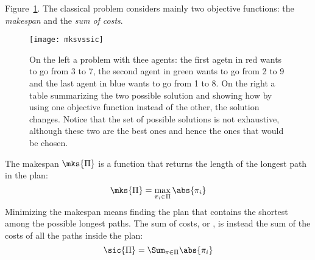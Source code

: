 Figure~\ref{fig:mksvssic}. The classical problem considers mainly two objective
functions: the \textit{makespan} and the \textit{sum of costs}. 
\begin{figure}[t]
  \centering
  \begin{minipage}{0.38\linewidth}
    \texttt{[image: mksvssic]}
  \end{minipage}
  \hfill
  
  \caption{On the left a  problem with thee agents: the first agetn
  in red wants to go from 3 to 7, the second agent in green wants to go from 2
  to 9 and the last agent in blue wants to go from 1 to 8. On the right a table
  summarizing the two possible solution and showing how by using one objective
  function instead of the other, the solution changes. Notice that the set of
  possible solutions is not exhaustive, although these two are the best ones 
  and hence the ones that would be chosen.}
  \label{fig:mksvssic}
\end{figure}
\newline
The makespan $\mks{\Pi}$ is a function that returns the length of the longest
path in the plan:
\begin{equation}
  \mks{\Pi}=\max\limits_{\pi_i\in\Pi}\abs{\pi_i}
  \label{eq:mks}
\end{equation}
Minimizing the makespan means finding the plan that contains the shortest
among the possible longest paths. \newline
The sum of costs, or , is instead the sum of the costs of all the
paths inside the plan:
\begin{equation}
  \sic{\Pi}=\Sum_{\pi\in\Pi}\abs{\pi_i}
  \label{eq:sic}
\end{equation}
%
%
